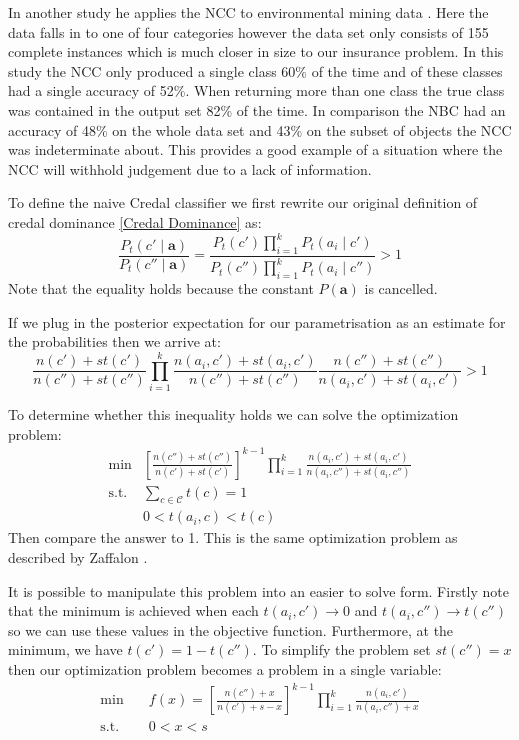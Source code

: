 In another study he applies the NCC to environmental mining data \cite{Zaffalon02}.
Here the data falls in to one of four categories however the data set only consists of 155 complete instances which is much closer in size to our insurance problem.
In this study the NCC only produced a single class 60\% of the time and of these classes had a single accuracy of 52\%.
When returning more than one class the true class was contained in the output set 82\% of the time.
In comparison the NBC had an accuracy of 48\% on the whole data set and 43\% on the subset of objects the NCC was indeterminate about.
This provides a good example of a situation where the NCC will withhold judgement due to a lack of information.

To define the naive Credal classifier we first rewrite our original definition of credal dominance \cref{Credal Dominance} as:
\begin{equation}
	\frac{P_t(c' \mid \mathbf{a})}{P_t(c'' \mid \mathbf{a})} = \frac{P_t(c')\prod_{i=1}^{k}P_t(a_i \mid c')}{P_t(c'')\prod_{i=1}^{k}P_t(a_i \mid c'')} > 1
\end{equation}
Note that the equality holds because the constant $P(\mathbf{a})$ is cancelled.

If we plug in the posterior expectation for our parametrisation as an estimate for the probabilities then we arrive at:
\begin{equation}
	\frac{n(c')+st(c')}{n(c'')+st(c'')} \prod_{i=1}^k \frac{n(a_i, c') + st(a_i , c')}{n(c'') + st(c'')} \frac{n(c'') + st(c'')}{n(a_i, c') + st(a_i , c')} > 1
\end{equation}

To determine whether this inequality holds we can solve the optimization problem:
\begin{align}
	\min & \left[ \frac{n(c'')+st(c'')}{n(c')+st(c')} \right]^{k-1} \prod_{i=1}^k \frac{n(a_i, c') + st(a_i , c')}{n(a_i, c'') + st(a_i , c'')} \\
	\text{s.t.} & \sum_{c \in \mathcal{C}} t(c) = 1 \\
	& 0 < t(a_i, c) < t(c)
\end{align}
Then compare the answer to 1.
This is the same optimization problem as described by Zaffalon \cite{Zaffalon01}.

It is possible to manipulate this problem into an easier to solve form.
Firstly note that the minimum is achieved when each $t(a_i, c') \rightarrow 0$ and $t(a_i, c'') \rightarrow t(c'')$ so we can use these values in the objective function.
Furthermore, at the minimum, we have $t(c') = 1 - t(c'')$.
To simplify the problem set $st(c'') = x$ then our optimization problem becomes a problem in a single variable:
\begin{align} \label{Credal Dominance Test}
	\min \quad & f(x) = \left[ \frac{n(c'') + x}{n(c') + s - x} \right]^{k-1} \prod_{i=1}^k \frac{n(a_i, c')}{n(a_i, c'') + x} \\
	\text{s.t.} \quad & 0 < x < s
\end{align}

